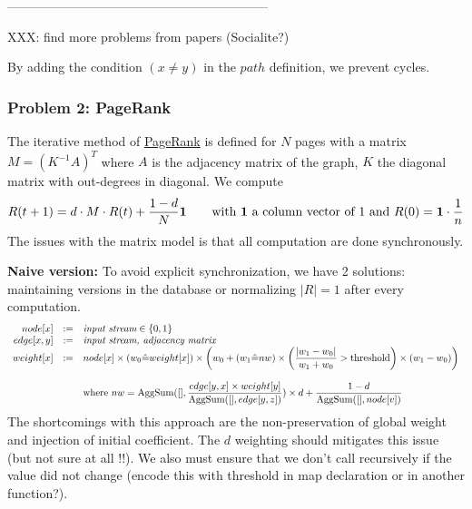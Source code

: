 \documentclass[11pt]{article}
\begin{document}
--------------------------------------------------------------

XXX: find more problems from papers (Socialite?)


By adding the condition $(x\ne y )$ in the $path$ definition, we prevent cycles.

\subsubsection*{Problem 2: PageRank}
The iterative method of \href{http://en.wikipedia.org/wiki/PageRank#Iterative}{PageRank} is defined for $N$ pages with a matrix $M=(K^{-1} A)^T$ where $A$ is the adjacency matrix of the graph, $K$ the diagonal matrix with out-degrees in diagonal. We compute \[R(t+1)=d\cdot M\cdot R(t)+\dfrac{1-d}{N}{\bf 1} \qquad \text{with {\bf 1} a column vector of 1 and }R(0)={\bf 1}\cdot \frac{1}{n}\]
The issues with the matrix model is that all computation are done synchronously.

\textbf{Naive version:} To avoid explicit synchronization, we have 2 solutions: maintaining versions in the database or normalizing $|R|=1$ after every computation.
\[\begin{array}{rrl}
node[x] &:=& \text{\it input stream} \in\{0,1\} \\
edge[x,y] &:=& \text{\it input stream, adjacency matrix} \\
weight[x] &:=& node[x] \times (w_0\hat=weight[x]) \times \left( w_0 + (w_1\hat=nw) \times \left(
\dfrac{|w_1 - w_0|}{w_1+w_0} > {\rm threshold}\right) \times (w_1-w_0) \right) \\ \\
&& \text{where } nw= {\rm AggSum}([], \dfrac{edge[y,x] \times weight[y]}{{\rm AggSum}([],edge[y,z])}) \times d + \dfrac{1-d}{{\rm AggSum}([],node[v])}\\
\end{array}\]
The shortcomings with this approach are the non-preservation of global weight and injection of initial coefficient. The $d$ weighting should mitigates this issue (but not sure at all !!). We also must ensure that we don't call recursively if the value did not change (encode this with threshold in map declaration or in another function?).
\end{document}
